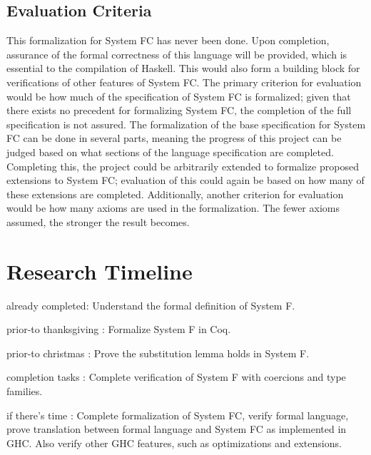 \documentclass{sig-alternate}
\begin{document}
\subsection{Evaluation Criteria}
\label{subsec:eval_criteria}
This formalization for System FC has never been done. Upon completion, assurance of the formal correctness of this language will be provided, which is essential to the compilation of Haskell. This would also form a building block for verifications of other features of System FC.
The primary criterion for evaluation would be how much of the specification of System FC is formalized; given that there exists no precedent for formalizing System FC, the completion of the full specification is not assured. The formalization of the base specification for System FC can be done in several parts, meaning the progress of this project can be judged based on what sections of the language specification are completed. Completing this, the project could be arbitrarily extended to formalize proposed extensions to System FC; evaluation of this could again be based on how many of these extensions are completed. Additionally, another criterion for evaluation would be how many axioms are used in the formalization. The fewer axioms assumed, the stronger the result becomes.

\section{Research Timeline}
\label{sec:research_timeline}
\begin{itemize*}
	\item {\sc already completed}: Understand the formal definition of System F.
	\item {\sc prior-to thanksgiving} : Formalize System F in Coq.
	\item {\sc prior-to christmas} : Prove the substitution lemma holds in System F.
	\item {\sc completion tasks} : Complete verification of System F with coercions and type families.
	\item {\sc if there's time} : Complete formalization of System FC, verify formal language, prove translation between formal language and System FC as implemented in GHC. Also verify other GHC features, such as optimizations and extensions.
\end{itemize*}


\vspace{175pt}
\end{document}
